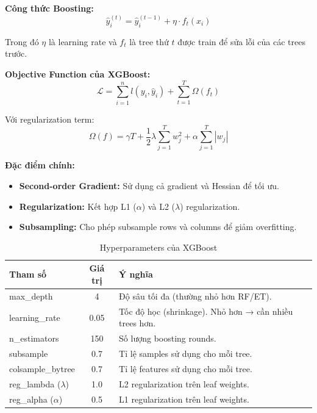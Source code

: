 \documentclass[12pt,a4paper]{article}
\begin{document}
\textbf{Công thức Boosting:}
\begin{equation}
\hat{y}_i^{(t)} = \hat{y}_i^{(t-1)} + \eta \cdot f_t(x_i)
\end{equation}

Trong đó $\eta$ là learning rate và $f_t$ là tree thứ $t$ được train để sửa lỗi của các trees trước.

\textbf{Objective Function của XGBoost:}
\begin{equation}
\mathcal{L} = \sum_{i=1}^{n} l(y_i, \hat{y}_i) + \sum_{t=1}^{T} \Omega(f_t)
\end{equation}

Với regularization term:
\begin{equation}
\Omega(f) = \gamma T + \frac{1}{2}\lambda \sum_{j=1}^{T} w_j^2 + \alpha \sum_{j=1}^{T} |w_j|
\end{equation}

\textbf{Đặc điểm chính:}
\begin{itemize}
    \item \textbf{Second-order Gradient:} Sử dụng cả gradient và Hessian để tối ưu.
    \item \textbf{Regularization:} Kết hợp L1 ($\alpha$) và L2 ($\lambda$) regularization.
    \item \textbf{Subsampling:} Cho phép subsample rows và columns để giảm overfitting.
\end{itemize}

\begin{table}[H]
\centering
\caption{Hyperparameters của XGBoost}
\begin{tabular}{|l|c|p{6.5cm}|}
\hline
\textbf{Tham số} & \textbf{Giá trị} & \textbf{Ý nghĩa} \\
\hline
max\_depth & 4 & Độ sâu tối đa (thường nhỏ hơn RF/ET). \\
\hline
learning\_rate & 0.05 & Tốc độ học (shrinkage). Nhỏ hơn → cần nhiều trees hơn. \\
\hline
n\_estimators & 150 & Số lượng boosting rounds. \\
\hline
subsample & 0.7 & Tỉ lệ samples sử dụng cho mỗi tree. \\
\hline
colsample\_bytree & 0.7 & Tỉ lệ features sử dụng cho mỗi tree. \\
\hline
reg\_lambda ($\lambda$) & 1.0 & L2 regularization trên leaf weights. \\
\hline
reg\_alpha ($\alpha$) & 0.5 & L1 regularization trên leaf weights. \\
\hline
\end{tabular}
\end{table}
\end{document}
